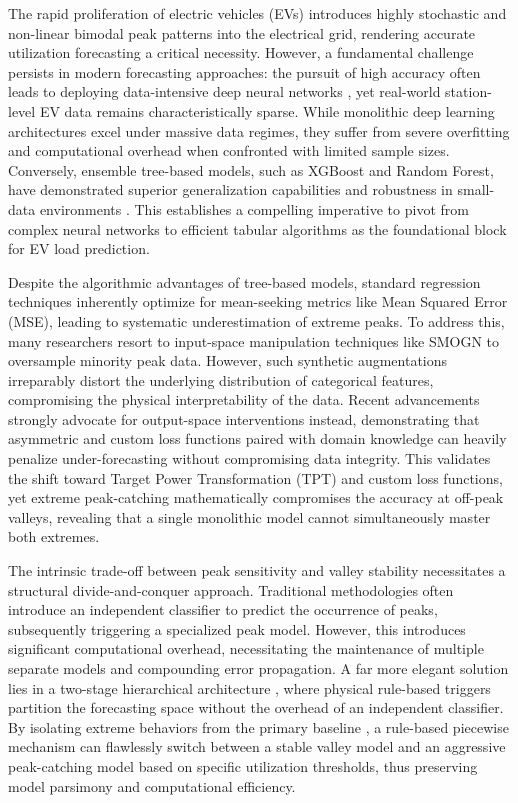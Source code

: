 \documentclass[pdflatex,sn-mathphys-num]{sn-jnl}%
\theoremstyle{thmstyleone}%
\theoremstyle{thmstyletwo}%
\theoremstyle{thmstylethree}%
\begin{document}
The rapid proliferation of electric vehicles (EVs) introduces highly stochastic and non-linear bimodal peak patterns into the electrical grid, rendering accurate utilization forecasting a critical necessity. However, a fundamental challenge persists in modern forecasting approaches: the pursuit of high accuracy often leads to deploying data-intensive deep neural networks \cite{eren2024comprehensive, zhu2019electric}, yet real-world station-level EV data remains characteristically sparse. While monolithic deep learning architectures excel under massive data regimes, they suffer from severe overfitting and computational overhead when confronted with limited sample sizes. Conversely, ensemble tree-based models, such as XGBoost and Random Forest, have demonstrated superior generalization capabilities and robustness in small-data environments \cite{lu2021comparative, wang2020ensemble, shahriar2020machine}. This establishes a compelling imperative to pivot from complex neural networks to efficient tabular algorithms as the foundational block for EV load prediction.

Despite the algorithmic advantages of tree-based models, standard regression techniques inherently optimize for mean-seeking metrics like Mean Squared Error (MSE), leading to systematic underestimation of extreme peaks. To address this, many researchers resort to input-space manipulation techniques like SMOGN to oversample minority peak data. However, such synthetic augmentations irreparably distort the underlying distribution of categorical features, compromising the physical interpretability of the data. Recent advancements strongly advocate for output-space interventions instead, demonstrating that asymmetric and custom loss functions \cite{wu2021support, ko2025deterministic, kim2026methodology} paired with domain knowledge can heavily penalize under-forecasting without compromising data integrity. This validates the shift toward Target Power Transformation (TPT) and custom loss functions, yet extreme peak-catching mathematically compromises the accuracy at off-peak valleys, revealing that a single monolithic model cannot simultaneously master both extremes.

The intrinsic trade-off between peak sensitivity and valley stability necessitates a structural divide-and-conquer approach. Traditional methodologies often introduce an independent classifier to predict the occurrence of peaks, subsequently triggering a specialized peak model. However, this introduces significant computational overhead, necessitating the maintenance of multiple separate models and compounding error propagation. A far more elegant solution lies in a two-stage hierarchical architecture \cite{laouafi2016daily, hsu2018two}, where physical rule-based triggers partition the forecasting space without the overhead of an independent classifier. By isolating extreme behaviors from the primary baseline \cite{chen2019short, rubasinghe2023highly, papadakis1998novel}, a rule-based piecewise mechanism can flawlessly switch between a stable valley model and an aggressive peak-catching model based on specific utilization thresholds, thus preserving model parsimony and computational efficiency.
\end{document}
